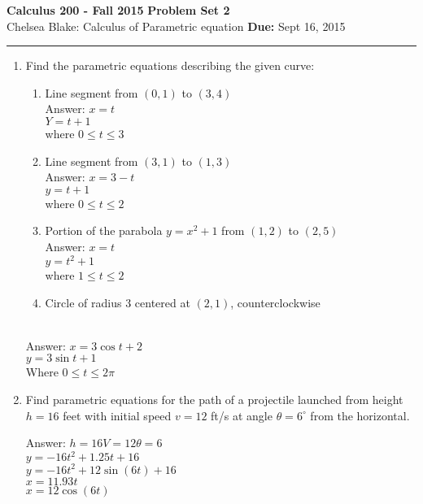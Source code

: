 \documentclass[11pt]{article}
\newcommand{\hwheadings}[3]{
{\bf Calculus 200 -  Fall 2015} \hfill {{\bf Problem Set #1}}\\
{{\bf } #2} \hfill {{\bf Due:} #3} \\
\rule[0.1in]{\textwidth}{0.025in}
}
\begin{document}
\hwheadings{2}{Chelsea Blake: Calculus of Parametric equation }{Sept 16, 2015}


\begin{enumerate}

 \item Find the parametric equations describing the given curve:
 
 
 
  \begin{enumerate}

    \item Line segment from $(0, 1)$ to $(3,4)$
    \\
    Answer: $x=t$
    \\
    $Y=t+1$
    \\
    where $0 \le t \le 3$
    
    \item Line segment from $(3, 1)$ to $(1,3)$
    \\
    Answer: $x=3-t$
    \\
    $y=t+1$
    \\
    where $0 \le t \le 2$
  
    \item Portion of the parabola $y=x^2+1$ from $(1, 2)$ to $(2,5)$
    \\
    Answer: $x=t$
    \\
    $y=t^2+1$
    \\
    where $1 \le t \le 2$
    
    
   \item Circle of radius 3 centered at $(2, 1)$, counterclockwise
\end{enumerate}   
\\
Answer: $x=3 \cos t +2$
\\
$y=3 \sin t +1$
\\
Where $0 \le t \le 2 \pi$



    
 \item Find parametric equations for the path of a projectile launched from height $h=16$ feet with initial speed $v = 12$ ft/s at angle $\theta = 6^\circ$ from the horizontal.   
    
    Answer: $h=16 V=12 \theta = 6$
    \\
    $y=-16t^2+1.25t+16$
    \\
    $y=-16t^2+12 \sin (6t) +16$
    \\
    $x=11.93t$
    \\
    $x=12 \cos (6t)$
    

\end{enumerate}
\end{document}
